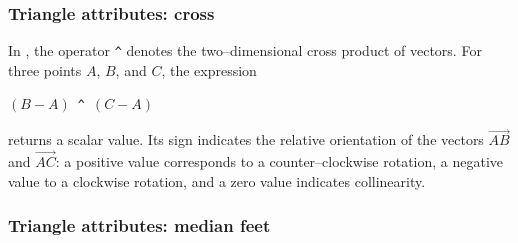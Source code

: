 \begin{tkzexample}[latex=.5\textwidth]
\begin{center}
\end{center}
\end{tkzexample}

\subsubsection{Triangle attributes: cross}
\label{ssub:triangle_attributes_cross}
In , the operator \verb|^| denotes the two--dimensional
cross product of vectors.
For three points $A$, $B$, and $C$, the expression

$(B - A)$\ \verb|^|\ $(C - A)$

returns a scalar value.
Its sign indicates the relative orientation of the vectors
$\overrightarrow{AB}$ and $\overrightarrow{AC}$:
a positive value corresponds to a counter--clockwise rotation,
a negative value to a clockwise rotation,
and a zero value indicates collinearity.

\begin{tkzexample}[latex=.5\textwidth]
\begin{center}
\end{center}
\end{tkzexample}

\subsubsection{Triangle attributes: median feet}
\label{ssub:triangle_attributes_foot_median}

